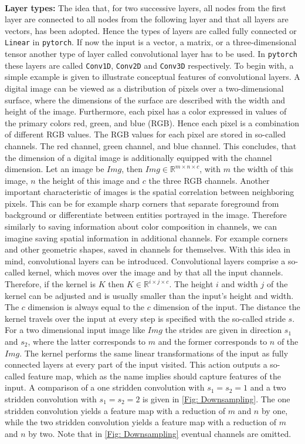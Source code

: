 \\
\textbf{Layer types:} The idea that, for two successive layers, all nodes from the first layer are connected to all nodes from the following layer and that all layers are vectors, has been adopted. Hence the types of layers are called fully connected or \texttt{Linear} in \texttt{pytorch}\cite{torch_ini}. If now the input is a vector, a matrix, or a three-dimensional tensor another type of layer called convolutional layer has to be used. In \texttt{pytorch} these layers are called \texttt{Conv1D}, \texttt{Conv2D} and \texttt{Conv3D} respectively.  
To begin with, a simple example is given to illustrate conceptual features of convolutional layers. A digital image can be viewed as a distribution of pixels over a two-dimensional surface, where the dimensions of the surface are described with the width and height of the image. Furthermore, each pixel has a color expressed in values of the primary colors red, green, and blue (RGB). Hence each pixel is a combination of different RGB values. The RGB values for each pixel are stored in so-called channels. The red channel, green channel, and blue channel. This concludes, that the dimension of a digital image is additionally equipped with the channel dimension. Let an image be \(Img\), then  \(Img \in \mathbb{R}^{m\times n\times c}\), with \(m\) the width of this image, \(n\) the height of this image and \(c\) the three RGB channels. Another important characteristic of images is the spatial correlation between neighboring pixels. This can be for example sharp corners that separate foreground from background or differentiate between entities portrayed in the image. Therefore similarly to saving information about color composition in channels, we can imagine saving spatial information in additional channels. For example corners and other geometric shapes,  saved in channels for themselves. With this idea in mind, convolutional layers can be introduced. Convolutional layers comprise a so-called kernel, which moves over the image and by that all the input channels. Therefore, if the kernel is $K$ then $K \in \mathbb{R}^{i\times j\times c}$. The height $i$ and width $j$ of the kernel can be adjusted and is usually smaller than the input's height and width. The $c$ dimension is always equal to the $c$ dimension of the input. The distance the kernel travels over the input at every step is specified with the so-called stride $s$. For a two dimensional input image like $Img$ the strides are given in direction $s_1$  and $s_2$, where the latter corresponds to $m$ and the former corresponds to $n$ of the $Img$. The kernel performs the same linear transformations of the input as fully connected layers at every part of the input visited. This action outputs a so-called feature map, which as the name implies should capture features of the input. A comparison of a one stridden convolution with $s_1=s_2=1$ and a two stridden convolution with $s_1=s_2=2$ is given in \cref{Fig: Downsampling}. The one stridden convolution yields a feature map with a reduction of $m$ and $n$ by one, while the two stridden convolution yields a feature map with a reduction of $m$ and $n$ by two. Note that in \cref{Fig: Downsampling} eventual channels are omitted.\\
